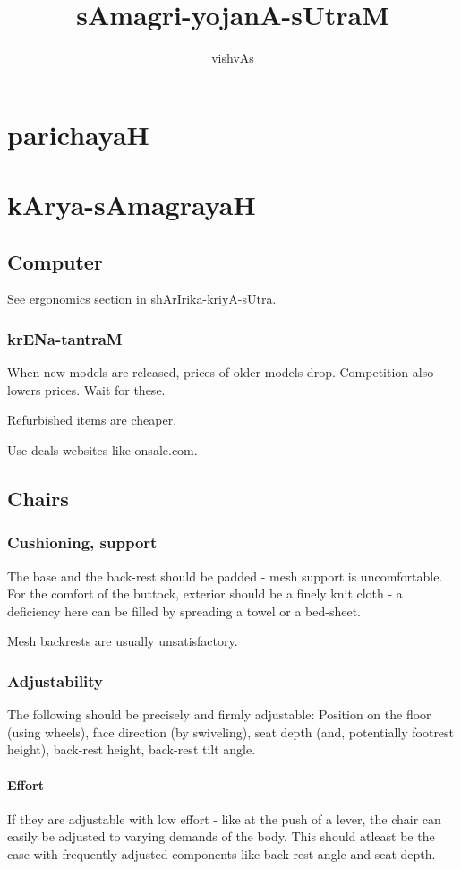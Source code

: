 \documentclass[oneside, article]{memoir}
\title{sAmagri-yojanA-sUtraM}
\author{vishvAs}
\begin{document}
\maketitle
\part{parichayaH}


\part{kArya-sAmagrayaH}
\chapter{Computer}
See ergonomics section in shArIrika-kriyA-sUtra.

\section{krENa-tantraM}
When new models are released, prices of older models drop. Competition also lowers prices. Wait for these.

Refurbished items are cheaper.

Use deals websites like onsale.com. 

\chapter{Chairs}
\section{Cushioning, support}
The base and the back-rest should be padded - mesh support is uncomfortable. For the comfort of the buttock, exterior should be a finely knit cloth - a deficiency here can be filled by spreading a towel or a bed-sheet.

Mesh backrests are usually unsatisfactory.

\section{Adjustability}
The following should be precisely and firmly adjustable: Position on the floor (using wheels), face direction (by swiveling), seat depth (and, potentially footrest height), back-rest height,  back-rest tilt angle.

\subsection{Effort}
If they are adjustable with low effort - like at the push of a lever, the chair can easily be adjusted to varying demands of the body. This should atleast be the case with frequently adjusted components like back-rest angle and seat depth.
\end{document}
